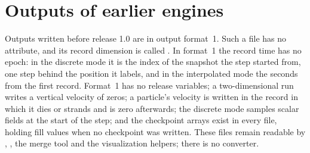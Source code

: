 \section{Outputs of earlier engines}\label{sec:out-format1}

Outputs written before release 1.0 are in output format~1. Such a file has no
 attribute, and its record dimension is called . In format~1 the record time has
no epoch: in the discrete mode it is the index of the snapshot the step started from, one step behind the
position it labels, and in the interpolated mode the seconds from the first record. Format~1 has no release
variables; a two-dimensional run writes a vertical velocity of zeros; a particle's velocity is written in the
record in which it dies or strands and is zero afterwards; the discrete mode samples scalar fields at the
start of the step; and the checkpoint arrays exist in every file, holding fill values when no checkpoint was
written. These files remain readable by , , the merge tool and the
visualization helpers; there is no converter.

